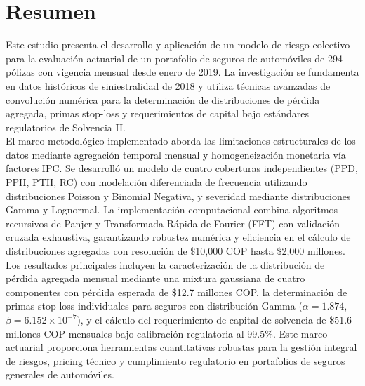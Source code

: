 \section*{Resumen}

Este estudio presenta el desarrollo y aplicación de un modelo de riesgo colectivo para la evaluación actuarial de un portafolio de seguros de automóviles de 294 pólizas con vigencia mensual desde enero de 2019. La investigación se fundamenta en datos históricos de siniestralidad de 2018 y utiliza técnicas avanzadas de convolución numérica para la determinación de distribuciones de pérdida agregada, primas stop-loss y requerimientos de capital bajo estándares regulatorios de Solvencia II.\\

El marco metodológico implementado aborda las limitaciones estructurales de los datos mediante agregación temporal mensual y homogeneización monetaria vía factores IPC. Se desarrolló un modelo de cuatro coberturas independientes (PPD, PPH, PTH, RC) con modelación diferenciada de frecuencia utilizando distribuciones Poisson y Binomial Negativa, y severidad mediante distribuciones Gamma y Lognormal. La implementación computacional combina algoritmos recursivos de Panjer y Transformada Rápida de Fourier (FFT) con validación cruzada exhaustiva, garantizando robustez numérica y eficiencia en el cálculo de distribuciones agregadas con resolución de \$10,000 COP hasta \$2,000 millones.\\

Los resultados principales incluyen la caracterización de la distribución de pérdida agregada mensual mediante una mixtura gaussiana de cuatro componentes con pérdida esperada de \$12.7 millones COP, la determinación de primas stop-loss individuales para seguros con distribución Gamma ($\alpha=1.874$, $\beta=6.152 \times 10^{-7}$), y el cálculo del requerimiento de capital de solvencia de \$51.6 millones COP mensuales bajo calibración regulatoria al 99.5\%. Este marco actuarial proporciona herramientas cuantitativas robustas para la gestión integral de riesgos, pricing técnico y cumplimiento regulatorio en portafolios de seguros generales de automóviles.